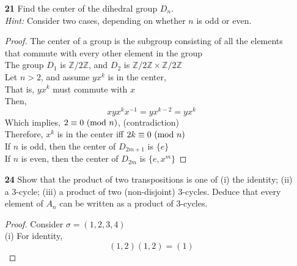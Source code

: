 \documentclass[paper=usletter, fontsize=12pt]{article}
\begin{document}
\begin{itemize}
\begin{itemize}
\begin{proof}
            \end{proof}

            \item[\textbf{21}] Find the center of the dihedral group $D_n$. \\
            \textit{Hint:} Consider two cases, depending on whether $n$ is odd
            or even.
            \begin{proof}

                The center of a group is the subgroup consisting of all the
                elements that commute with every other element in the group\\
                The group $D_1$ is $\mathbb{Z}/2\mathbb{Z}$, and $D_2$ is
                $\mathbb{Z}/2\mathbb{Z}\times\mathbb{Z}/2\mathbb{Z}$ \\
                Let $n > 2$, and assume $yx^k$ is in the center,\\
                That is, $yx^k$ must commute with $x$\\
                Then,
                \begin{equation*}
                    xyx^kx^{-1} = yx^{k-2} = yx^k
                \end{equation*}
                Which implies, $2 \equiv 0 \ (\mathrm{mod}\ n)$, (contradiction)\\
                Therefore, $x^k$ is in the center iff $2k \equiv 0 \ (\mathrm{mod}\ n)$\\
                If $n$ is odd, then the center of $D_{2m+1}$ is $\{e\}$\\
                If $n$ is even, then the center of $D_{2m}$ is $\{e,x^m\}$ \qedhere

            \end{proof}

            \item[\textbf{24}] Show that the product of two transpositions is
            one of (i) the identity; (ii) a 3-cycle; (iii) a product of two
            (non-disjoint) 3-cycles. Deduce that every element of $A_n$ can be
            written as a product of 3-cycles.
            \begin{proof}

                Consider $\sigma = (1,2,3,4)$\\
                (i) For identity,
                \begin{equation*}
                    (1,2)(1,2) = (1)
                \end{equation*}


\end{proof}
\end{itemize}
\end{itemize}
\end{document}
